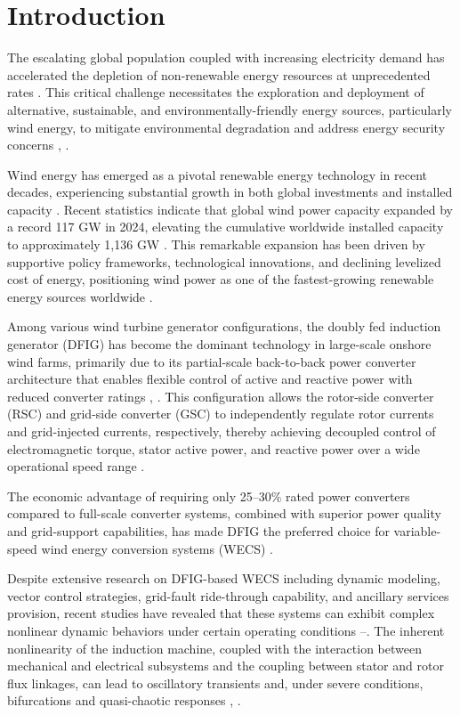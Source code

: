 \documentclass[conference]{IEEEtran}
\begin{document}
\section{Introduction}

The escalating global population coupled with increasing electricity demand has accelerated the depletion of non-renewable energy resources at unprecedented rates \cite{b1}. This critical challenge necessitates the exploration and deployment of alternative, sustainable, and environmentally-friendly energy sources, particularly wind energy, to mitigate environmental degradation and address energy security concerns \cite{b2}, \cite{b3}.

Wind energy has emerged as a pivotal renewable energy technology in recent decades, experiencing substantial growth in both global investments and installed capacity \cite{b4}. Recent statistics indicate that global wind power capacity expanded by a record 117 GW in 2024, elevating the cumulative worldwide installed capacity to approximately 1,136 GW \cite{b5}. This remarkable expansion has been driven by supportive policy frameworks, technological innovations, and declining levelized cost of energy, positioning wind power as one of the fastest-growing renewable energy sources worldwide \cite{b6}.

Among various wind turbine generator configurations, the doubly fed induction generator (DFIG) has become the dominant technology in large-scale onshore wind farms, primarily due to its partial-scale back-to-back power converter architecture that enables flexible control of active and reactive power with reduced converter ratings \cite{b7}, \cite{b8}. This configuration allows the rotor-side converter (RSC) and grid-side converter (GSC) to independently regulate rotor currents and grid-injected currents, respectively, thereby achieving decoupled control of electromagnetic torque, stator active power, and reactive power over a wide operational speed range \cite{b9}.

The economic advantage of requiring only 25--30\% rated power converters compared to full-scale converter systems, combined with superior power quality and grid-support capabilities, has made DFIG the preferred choice for variable-speed wind energy conversion systems (WECS) \cite{b10}.

Despite extensive research on DFIG-based WECS including dynamic modeling, vector control strategies, grid-fault ride-through capability, and ancillary services provision, recent studies have revealed that these systems can exhibit complex nonlinear dynamic behaviors under certain operating conditions \cite{b11}--\cite{b13}. The inherent nonlinearity of the induction machine, coupled with the interaction between mechanical and electrical subsystems and the coupling between stator and rotor flux linkages, can lead to oscillatory transients and, under severe conditions, bifurcations and quasi-chaotic responses \cite{b14}, \cite{b15}.
\end{document}
